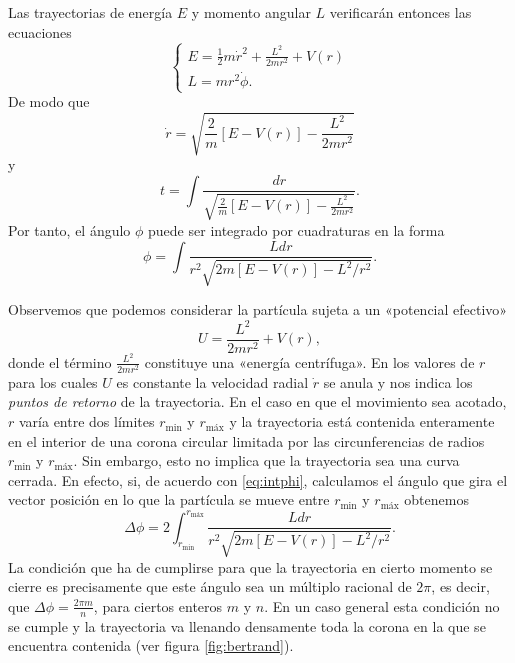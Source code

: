 \documentclass[12pt,a4paper,twoside]{article}
\theoremstyle{definition} \newtheorem{defn}[thm]{Definición}
\theoremstyle{definition} \newtheorem{ejemplo}[thm]{Ejemplo}
\theoremstyle{definition} \newtheorem{ejercicio}[thm]{Ejercicio}
\theoremstyle{remark} \newtheorem*{obs}{Observación}
\begin{document}
  Las trayectorias de energía $E$ y momento angular $L$ verificarán entonces las ecuaciones
  \begin{equation}
    \begin{cases}
    E=\tfrac{1}{2}m\dot r^2+\frac{L^2}{2mr^2}+V(r) \\
    L=mr^2\dot \phi.
  \end{cases}
  \end{equation}
  De modo que
  \begin{equation}
      \dot r=\sqrt{\frac{2}{m}[E-V(r)]-\frac{L^2}{2mr^2}} 
  \end{equation}
  y 
  \begin{equation}
    t=\int \frac{dr}{\sqrt{\frac{2}{m}[E-V(r)]-\frac{L^2}{2mr^2}}}.
  \end{equation}
  Por tanto, el ángulo $\phi$ puede ser integrado por cuadraturas en la forma
  \begin{equation}
    \phi=\int\frac{Ldr}{r^2\sqrt{2m[E-V(r)]-L^2/r^2}}. 
    \label{eq:intphi}
  \end{equation}

Observemos que podemos considerar la partícula sujeta a un «potencial efectivo»
\begin{equation}
  U=\frac{L^2}{2mr^2}+V(r),
\end{equation}
donde el término $\frac{L^2}{2mr^2}$ constituye una «energía centrífuga». En los valores de $r$ para los cuales $U$ es constante la velocidad radial $\dot r$ se anula y nos indica los \emph{puntos de retorno} de la trayectoria. En el caso en que el movimiento sea acotado, $r$ varía entre dos límites $r_{\text{min}}$ y $r_{\text{máx}}$ y la trayectoria está contenida enteramente en el interior de una corona circular limitada por las circunferencias de radios $r_{\text{min}}$ y $r_{\text{máx}}$. Sin embargo, esto no implica que la trayectoria sea una curva cerrada. En efecto, si, de acuerdo con \eqref{eq:intphi}, calculamos el ángulo que gira el vector posición en lo que la partícula se mueve entre $r_{\text{min}}$ y $r_{\text{máx}}$ obtenemos
\begin{equation}
  \Delta \phi = 2\int_{r_{\text{min}}}^{r_{\text{máx}}} \frac{Ldr}{r^2\sqrt{2m[E-V(r)]-L^2/r^2}}.
\end{equation}
La condición que ha de cumplirse para que la trayectoria en cierto momento se cierre es precisamente que este ángulo sea un múltiplo racional de $2\pi$, es decir, que $\Delta \phi = \frac{2\pi m}{n}$, para ciertos enteros $m$ y $n$. En un caso general esta condición no se cumple y la trayectoria va llenando densamente toda la corona en la que se encuentra contenida (ver figura \ref{fig:bertrand}).
\end{document}
